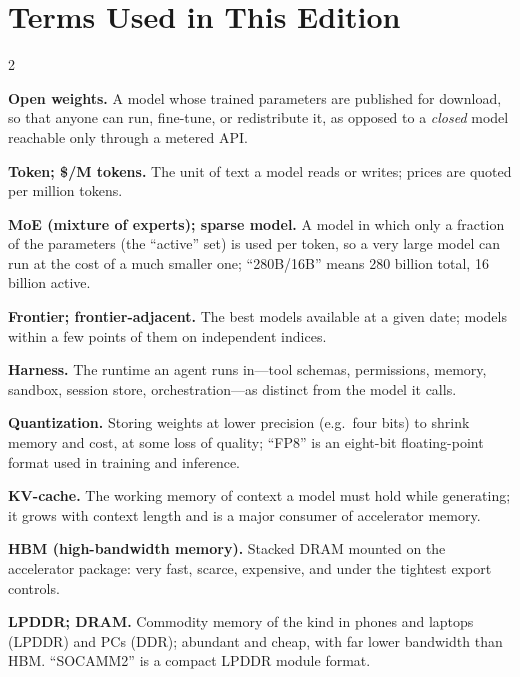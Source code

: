 \chapter*{Terms Used in This Edition}


\begin{multicols}{2}\small\raggedright
\setlength{\parindent}{0pt}\setlength{\parskip}{3pt}
\textbf{Open weights.} A model whose trained parameters are published for download, so that anyone can run, fine-tune, or redistribute it, as opposed to a \emph{closed} model reachable only through a metered API.\par
\textbf{Token; \$/M tokens.} The unit of text a model reads or writes; prices are quoted per million tokens.\par
\textbf{MoE (mixture of experts); sparse model.} A model in which only a fraction of the parameters (the ``active'' set) is used per token, so a very large model can run at the cost of a much smaller one; ``280B/16B'' means 280 billion total, 16 billion active.\par
\textbf{Frontier; frontier-adjacent.} The best models available at a given date; models within a few points of them on independent indices.\par
\textbf{Harness.} The runtime an agent runs in---tool schemas, permissions, memory, sandbox, session store, orchestration---as distinct from the model it calls.\par
\textbf{Quantization.} Storing weights at lower precision (e.g.\ four bits) to shrink memory and cost, at some loss of quality; ``FP8'' is an eight-bit floating-point format used in training and inference.\par
\textbf{KV-cache.} The working memory of context a model must hold while generating; it grows with context length and is a major consumer of accelerator memory.\par
\textbf{HBM (high-bandwidth memory).} Stacked DRAM mounted on the accelerator package: very fast, scarce, expensive, and under the tightest export controls.\par
\textbf{LPDDR; DRAM.} Commodity memory of the kind in phones and laptops (LPDDR) and PCs (DDR); abundant and cheap, with far lower bandwidth than HBM. ``SOCAMM2'' is a compact LPDDR module format.\par

\end{multicols}
